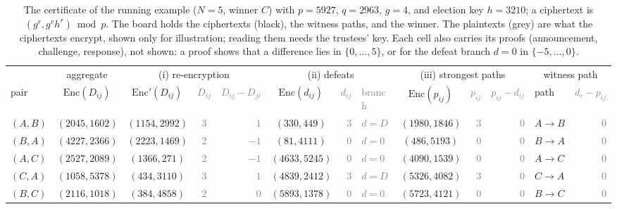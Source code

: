 \begin{table}[t]
  \caption{The certificate of the running example ($N = 5$, winner $C$) 
  with $p = 5927$, $q = 2963$, $g = 4$, and election key $h = 3210$; a ciphertext is
  $(g^r, g^v h^r) \bmod p$. The board holds the ciphertexts (black), the
  witness paths, and the winner. The plaintexts (grey) are what the
  ciphertexts encrypt, shown only for illustration; reading them needs the
  trustees' key. Each cell also carries its proofs (announcement,
  challenge, response), not shown: a proof shows that a difference lies in
  $\{0,\ldots,5\}$, or for the defeat branch $d = 0$ in
  $\{-5,\ldots,0\}$.}
  \label{tab:example-cert}
  \centering\scriptsize\setlength{\tabcolsep}{3.5pt}
  \newcommand{\hid}[1]{\textcolor{gray}{#1}}
  \begin{tabular}{@{}lcccrcrlcrrlr@{}}
    \toprule
    & aggregate & \multicolumn{3}{c}{(i) re-encryption} & \multicolumn{3}{c}{(ii) defeats} & \multicolumn{3}{c}{(iii) strongest paths} & \multicolumn{2}{c}{witness path} \\
    \cmidrule(lr){2-2}\cmidrule(lr){3-5}\cmidrule(lr){6-8}\cmidrule(lr){9-11}\cmidrule(l){12-13}
    pair & $\mathrm{Enc}(D_{ij})$ & $\mathrm{Enc}'(D_{ij})$ & \hid{$D_{ij}$} & \hid{$D_{ij} - D_{ji}$} & $\mathrm{Enc}(d_{ij})$ & \hid{$d_{ij}$} & \hid{branch} & $\mathrm{Enc}(p_{ij})$ & \hid{$p_{ij}$} & \hid{$p_{ij} - d_{ij}$} & path & \hid{$d_e - p_{ij}$} \\
    \midrule
    $(A,B)$ & $(2045, 1602)$ & $(1154, 2992)$ & \hid{$3$} & \hid{$1$}  & $(330, 449)$   & \hid{$3$} & \hid{$d = D$} & $(1980, 1846)$ & \hid{$3$} & \hid{$0$} & $A \to B$ & \hid{$0$} \\
    $(B,A)$ & $(4227, 2366)$ & $(2223, 1469)$ & \hid{$2$} & \hid{$-1$} & $(81, 4111)$   & \hid{$0$} & \hid{$d = 0$} & $(486, 5193)$  & \hid{$0$} & \hid{$0$} & $B \to A$ & \hid{$0$} \\
    $(A,C)$ & $(2527, 2089)$ & $(1366, 271)$  & \hid{$2$} & \hid{$-1$} & $(4633, 5245)$ & \hid{$0$} & \hid{$d = 0$} & $(4090, 1539)$ & \hid{$0$} & \hid{$0$} & $A \to C$ & \hid{$0$} \\
    $(C,A)$ & $(1058, 5378)$ & $(434, 3110)$  & \hid{$3$} & \hid{$1$}  & $(4839, 2412)$ & \hid{$3$} & \hid{$d = D$} & $(5326, 4082)$ & \hid{$3$} & \hid{$0$} & $C \to A$ & \hid{$0$} \\
    $(B,C)$ & $(2116, 1018)$ & $(384, 4858)$  & \hid{$2$} & \hid{$0$}  & $(5893, 1378)$ & \hid{$0$} & \hid{$d = 0$} & $(5723, 4121)$ & \hid{$0$} & \hid{$0$} & $B \to C$ & \hid{$0$} \\

\end{tabular}
\end{table}

